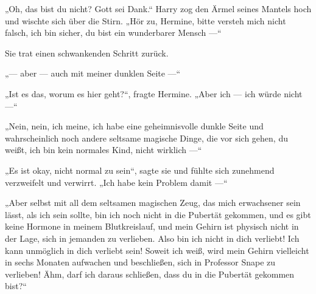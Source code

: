 „Oh, das bist du nicht? Gott sei Dank.“ Harry zog den Ärmel seines Mantels hoch und wischte sich über die Stirn.
„Hör zu, Hermine, bitte versteh mich nicht falsch, ich bin sicher, du bist ein wunderbarer Mensch —“

Sie trat einen schwankenden Schritt zurück.

„— aber — auch mit meiner dunklen Seite —“

„Ist es das, worum es hier geht?“, fragte Hermine.
„Aber ich — ich würde nicht —“

„Nein, nein, ich meine, ich habe eine geheimnisvolle dunkle Seite und wahrscheinlich noch andere seltsame magische Dinge, die vor sich gehen, du weißt, ich bin kein normales Kind, nicht wirklich —“

„Es ist okay, nicht normal zu sein“, sagte sie und fühlte sich zunehmend verzweifelt und verwirrt.
„Ich habe kein Problem damit —“

„Aber selbst mit all dem seltsamen magischen Zeug, das mich erwachsener sein lässt, als ich sein sollte, bin ich noch nicht in die Pubertät gekommen, und es gibt keine Hormone in meinem Blutkreislauf, und mein Gehirn ist physisch nicht in der Lage, sich in jemanden zu verlieben. Also bin ich nicht in dich verliebt! Ich kann unmöglich in dich verliebt sein! Soweit ich weiß, wird mein Gehirn vielleicht in sechs Monaten aufwachen und beschließen, sich in Professor Snape zu verlieben! Ähm, darf ich daraus schließen, dass du in die Pubertät gekommen bist?“


